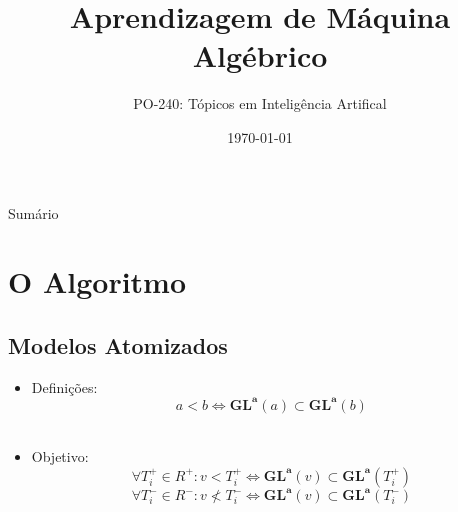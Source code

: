 \documentclass{beamer}
\title[AM Algébrico]{Aprendizagem de Máquina Algébrico}
\subtitle{PO-240: Tópicos em Inteligência Artifical}
\institute{ITA}
\author[Caio Costa]
{%
  \texorpdfstring{
    \begin{columns}%
      \column{.30\linewidth}
      \centering
      Caio Costa\\
      \href{mailto:caio.costa@ga.ita.br}{caio.costa@ga.ita.br}
    \end{columns}
    }{Caio Costa}
}
\date{\today}
\begin{document}

\begin{frame}
    \titlepage
\end{frame}

\begin{frame}{Sumário}
    \setcounter{tocdepth}{2}
    \tableofcontents
\end{frame}





\section{O Algoritmo}


\subsection{Modelos Atomizados}
\begin{frame}{\subsecname}
    \begin{itemize}
        \item Definições: \\
             {\[a < b \iff \mathbf{GL^a}(a) \subset \mathbf{GL^a}(b)\]}\\
        \item<3-> Objetivo: \\
            \[\forall T_i^{+} \in R^{+}\colon v < T_i^{+} \iff \mathbf{GL^a}(v) \subset \mathbf{GL^a}(T_i^{+})\]
            \[\forall T_i^{-} \in R^{-}\colon v \not< T_i^{-} \iff \mathbf{GL^a}(v) \subset \mathbf{GL^a}(T_i^{-})\]
    \end{itemize}
\end{frame}
\end{document}
